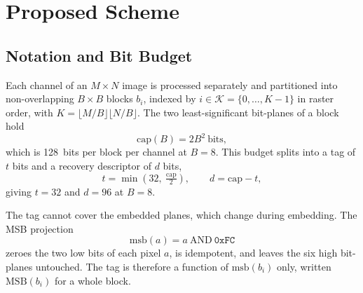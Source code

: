 \section{Proposed Scheme}
\label{sec:method}

\subsection{Notation and Bit Budget}
\label{ssec:budget}
Each channel of an $M\times N$ image is processed separately and partitioned into non-overlapping $B\times B$ blocks $b_i$, indexed by $i\in\mathcal{K}=\{0,\dots,K-1\}$ in raster order, with $K=\lfloor M/B\rfloor\lfloor N/B\rfloor$. The two least-significant bit-planes of a block hold
\begin{equation}
\mathrm{cap}(B)=2B^{2}\ \text{bits},
\label{eq:cap}
\end{equation}
which is 128~bits per block per channel at $B=8$. This budget splits into a tag of $t$ bits and a recovery descriptor of $d$ bits,
\begin{equation}
t=\min\!\left(32,\ \tfrac{\mathrm{cap}}{2}\right),\qquad d=\mathrm{cap}-t,
\label{eq:split}
\end{equation}
giving $t=32$ and $d=96$ at $B=8$.

The tag cannot cover the embedded planes, which change during embedding. The MSB projection
\begin{equation}
\mathrm{msb}(a)=a\ \mathrm{AND}\ \mathtt{0xFC}
\label{eq:msb}
\end{equation}
zeroes the two low bits of each pixel $a$, is idempotent, and leaves the six high bit-planes untouched. The tag is therefore a function of $\mathrm{msb}(b_i)$ only, written $\mathrm{MSB}(b_i)$ for a whole block.

